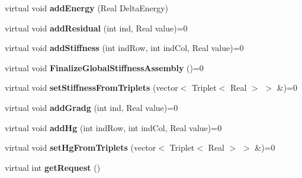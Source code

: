 \begin{DoxyCompactItemize}
\item 
\hypertarget{structvoom_1_1_elliptic_result_a64b986f20d17cd39c128b2731391f1f3}{
virtual void {\bfseries addEnergy} (Real DeltaEnergy)}
\label{structvoom_1_1_elliptic_result_a64b986f20d17cd39c128b2731391f1f3}

\item 
\hypertarget{structvoom_1_1_elliptic_result_a57637311e2ef8f95cb0d0c958d329616}{
virtual void {\bfseries addResidual} (int ind, Real value)=0}
\label{structvoom_1_1_elliptic_result_a57637311e2ef8f95cb0d0c958d329616}

\item 
\hypertarget{structvoom_1_1_elliptic_result_a16c80054a03eaec60a0f1d6ade2d7f49}{
virtual void {\bfseries addStiffness} (int indRow, int indCol, Real value)=0}
\label{structvoom_1_1_elliptic_result_a16c80054a03eaec60a0f1d6ade2d7f49}

\item 
\hypertarget{structvoom_1_1_elliptic_result_a5378cc9951f5bcb3072589637220e268}{
virtual void {\bfseries FinalizeGlobalStiffnessAssembly} ()=0}
\label{structvoom_1_1_elliptic_result_a5378cc9951f5bcb3072589637220e268}

\item 
\hypertarget{structvoom_1_1_elliptic_result_a2c4948feb24acfb6f1facb6d8b930ca5}{
virtual void {\bfseries setStiffnessFromTriplets} (vector$<$ Triplet$<$ Real $>$ $>$ \&)=0}
\label{structvoom_1_1_elliptic_result_a2c4948feb24acfb6f1facb6d8b930ca5}

\item 
\hypertarget{structvoom_1_1_elliptic_result_a8731f6c8fef81e2e8aeab294fd867c96}{
virtual void {\bfseries addGradg} (int ind, Real value)=0}
\label{structvoom_1_1_elliptic_result_a8731f6c8fef81e2e8aeab294fd867c96}

\item 
\hypertarget{structvoom_1_1_elliptic_result_a8cca5e3ca0192a02c6259ba7a86fe5bf}{
virtual void {\bfseries addHg} (int indRow, int indCol, Real value)=0}
\label{structvoom_1_1_elliptic_result_a8cca5e3ca0192a02c6259ba7a86fe5bf}

\item 
\hypertarget{structvoom_1_1_elliptic_result_a700f97feb6d6114fe1b7758a14597d1c}{
virtual void {\bfseries setHgFromTriplets} (vector$<$ Triplet$<$ Real $>$ $>$ \&)=0}
\label{structvoom_1_1_elliptic_result_a700f97feb6d6114fe1b7758a14597d1c}

\item 
\hypertarget{structvoom_1_1_elliptic_result_aab4586836f89ba7eead047af7f79d53b}{
virtual int {\bfseries getRequest} ()}
\label{structvoom_1_1_elliptic_result_aab4586836f89ba7eead047af7f79d53b}


\end{DoxyCompactItemize}

